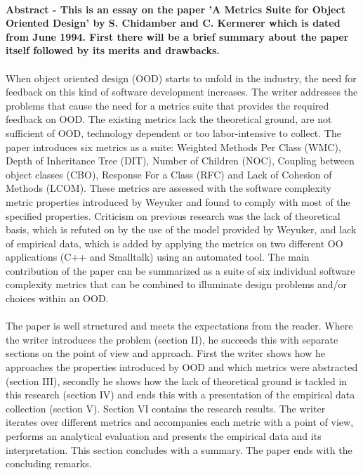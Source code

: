 \paragraph{}
\textbf{
Abstract - This is an essay on the paper 'A Metrics Suite for Object Oriented Design' by S. Chidamber and C.
Kermerer which is dated from June 1994. First there will be a brief summary about the paper itself followed by
its merits and drawbacks.
}

\paragraph{}
When object oriented design (OOD) starts to unfold in the industry, the need for feedback on this kind of software
development increases. The writer addresses the problems that cause the need for a metrics suite that provides the
required feedback on OOD. The existing metrics lack the theoretical ground, are not sufficient of OOD,
technology dependent or too labor-intensive to collect.
The paper introduces six metrics as a suite: Weighted Methods Per Class (WMC), Depth of Inheritance Tree (DIT),
Number of Children (NOC), Coupling between object classes (CBO), Response For a Class (RFC) and Lack of
Cohesion of Methods (LCOM). These metrics are assessed with the software complexity metric properties introduced by
Weyuker \autocite{WEYUKER} and found to comply with most of the specified properties.
Criticism on previous research was the lack of theoretical basis, which is refuted on by the use of the
model provided by Weyuker, and lack of empirical data, which is added by applying the metrics on two different OO
applications (C++ and Smalltalk) using an automated tool. The main contribution of the paper can be summarized as a
suite of six individual software complexity metrics that can be combined to illuminate design problems and/or choices
within an OOD.

\paragraph{}
The paper is well structured and meets the expectations from the reader. Where the writer introduces the problem
(section II), he succeeds this with separate sections on the point of view and approach. First the writer shows how he
approaches the properties introduced by OOD and which metrics were abstracted (section III), secondly he shows how the
lack of theoretical ground is tackled in this research (section IV) and ends this with a presentation of the empirical
data collection (section V). Section VI contains the research results. The writer iterates over different metrics and
accompanies each metric with a point of view, performs an analytical evaluation and presents the empirical data and its
interpretation. This section concludes with a summary. The paper ends with the concluding remarks.


